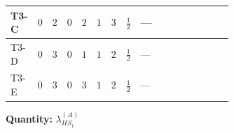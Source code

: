 \documentclass[8pt]{article}
\begin{document}
\begin{landscape}
\begin{longtable}{@{}llcccccc >{\raggedright\arraybackslash}p{0.21\linewidth} >{\raggedright\arraybackslash}p{0.21\linewidth} >{\raggedright\arraybackslash}p{0.21\linewidth}@{}}
\midrule
T3-C & $0$ & $2$ & $0$ & $2$ & $1$ & $3$ & $\frac{1}{2}$ & --- & \scriptsize\adjustbox{max width=\linewidth}{$\begin{gathered} -\frac{4}{3} \operatorname{Tr}\!\left({y_1}\,\left({y_1}\right)^{\dagger}\,{Y_e}\,\left({Y_e}\right)^{\dagger}\right)\end{gathered}$} & \scriptsize\adjustbox{max width=\linewidth}{$\begin{gathered} +\frac{16}{3} {\lambda_5} \left({\lambda_5}\right)^{*}\end{gathered}$} \\
\midrule
T3-D & $0$ & $3$ & $0$ & $1$ & $1$ & $2$ & $\frac{1}{2}$ & --- & \scriptsize\adjustbox{max width=\linewidth}{$\begin{gathered} -\frac{4}{3} \operatorname{Tr}\!\left({y_1}\,\left({y_1}\right)^{\dagger}\,{Y_e}\,\left({Y_e}\right)^{\dagger}\right)\end{gathered}$} & \scriptsize\adjustbox{max width=\linewidth}{$\begin{gathered} -\frac{8}{3} {\lambda_5} \left({\lambda_5}\right)^{*}\end{gathered}$} \\
\midrule
T3-E & $0$ & $3$ & $0$ & $3$ & $1$ & $2$ & $\frac{1}{2}$ & --- & \scriptsize\adjustbox{max width=\linewidth}{$\begin{gathered} -\frac{4}{3} \operatorname{Tr}\!\left({y_1}\,\left({y_1}\right)^{\dagger}\,{Y_e}\,\left({Y_e}\right)^{\dagger}\right)\end{gathered}$} & \scriptsize\adjustbox{max width=\linewidth}{$\begin{gathered} -\frac{4}{3} {\lambda_5} \left({\lambda_5}\right)^{*}\end{gathered}$} \\
\midrule
\bottomrule
\end{longtable}
\clearpage
\noindent\textbf{Quantity: }$\lambda_{HS_1}^{(A)}$\par\smallskip

\end{landscape}
\end{document}

